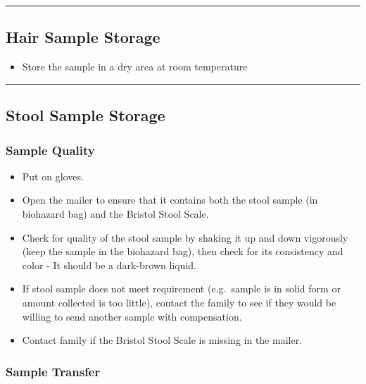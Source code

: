 \documentclass[]{book}
\providecommand{\tightlist}{%
  \setlength{\itemsep}{0pt}\setlength{\parskip}{0pt}}
\begin{document}
\begin{center}\rule{0.5\linewidth}{0.5pt}\end{center}

\hypertarget{hair-sample-storage}{%
\subsection{Hair Sample Storage}\label{hair-sample-storage}}

\begin{itemize}
\tightlist
\item
  Store the sample in a dry area at room temperature
\end{itemize}

\begin{center}\rule{0.5\linewidth}{0.5pt}\end{center}

\hypertarget{stool-sample-storage}{%
\subsection{Stool Sample Storage}\label{stool-sample-storage}}

\hypertarget{sample-quality}{%
\subsubsection{Sample Quality}\label{sample-quality}}

\begin{itemize}
\tightlist
\item
  Put on gloves.
\item
  Open the mailer to ensure that it contains both the stool sample (in biohazard bag) and the Bristol Stool Scale.
\item
  Check for quality of the stool sample by shaking it up and down vigorously (keep the sample in the biohazard bag), then check for its consistency and color - It should be a dark-brown liquid.
\item
  If stool sample does not meet requirement (e.g.~sample is in solid form or amount collected is too little), contact the family to see if they would be willing to send another sample with compensation.
\item
  Contact family if the Bristol Stool Scale is missing in the mailer.
\end{itemize}

\hypertarget{sample-transfer}{%
\subsubsection{Sample Transfer}\label{sample-transfer}}
\end{document}
